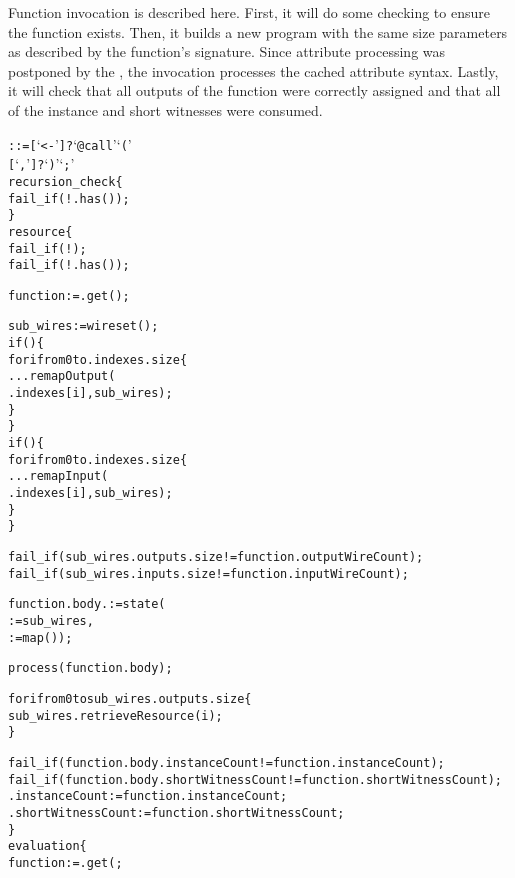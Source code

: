 Function invocation is described here.
First, it will do some checking to ensure the function exists.
Then, it builds a new program  with the same size parameters as described by the function's signature.
Since attribute processing was postponed by the , the invocation processes the cached attribute syntax.
Lastly, it will check that all outputs of the function were correctly assigned and that all of the instance and short witnesses were consumed.\\

\begin{alltt}\ttSyn
   ::= [  `<-' ]? `@call' `('
                    [ `,'  ]? `)' `;'\ttSem
  recursion_check \{
    fail_if(!.has());
  \}
  resource \{
    fail_if(!);
    fail_if(!.has());

    function := .get();

    sub_wires := wireset();
    if() \{
      for i from 0 to .indexes.size \{
        ...remapOutput(
          .indexes[i], sub_wires);
      \}
    \}
    if() \{
      for i from 0 to .indexes.size \{
        ...remapInput(
          .indexes[i], sub_wires);
      \}
    \}

    fail_if(sub_wires.outputs.size != function.outputWireCount);
    fail_if(sub_wires.inputs.size != function.inputWireCount);

    function.body. := state(
       := sub_wires,
       := map());

    process(function.body);

    for i from 0 to sub_wires.outputs.size \{
      sub_wires.retrieveResource(i);
    \}

    fail_if(function.body.instanceCount != function.instanceCount);
    fail_if(function.body.shortWitnessCount != function.shortWitnessCount);
    .instanceCount := function.instanceCount;
    .shortWitnessCount := function.shortWitnessCount;
  \}
  evaluation \{
    function := .get(;


\end{alltt}
